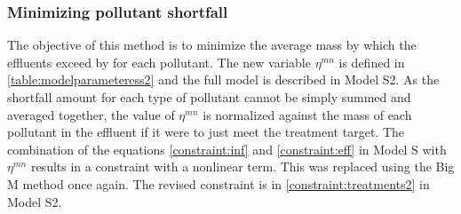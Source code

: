 \documentclass[preprint,12pt,authoryear]{elsarticle}
\begin{document}
\subsubsection{Minimizing pollutant shortfall}\label{subsect:minshortfall}
The objective of this method is to minimize the average mass by which the effluents exceed by for each pollutant. The new variable $\eta^{mn}$ is defined in \autoref{table:modelparameteress2} and the full model is described in Model S2. As the shortfall amount for each type of pollutant cannot be simply summed and averaged together, the value of $\eta^{mn}$ is normalized against the mass of each pollutant in the effluent if it were to just meet the treatment target. The combination of the equations \ref{constraint:inf} and \ref{constraint:eff} in Model S with $\eta^{mn}$ results in a constraint with a nonlinear term. This was replaced using the Big M method once again. The revised constraint is in \autoref{constraint:treatments2} in Model S2.
\end{document}
